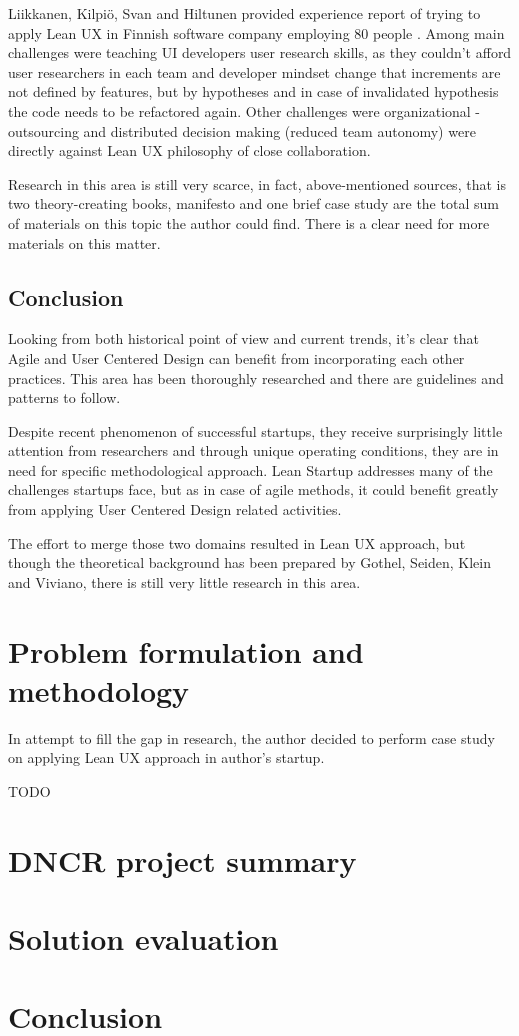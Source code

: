 \documentclass{article}
\begin{document}
Liikkanen, Kilpiö, Svan and Hiltunen provided experience report of trying to apply Lean UX in Finnish software company employing 80 people \cite{liikkanen2014lean}. Among main challenges were teaching UI developers user research skills, as they couldn't afford user researchers in each team and developer mindset change that increments are not defined by features, but by hypotheses and in case of invalidated hypothesis the code needs to be refactored again. Other challenges were organizational - outsourcing and distributed decision making (reduced team autonomy) were directly against Lean UX philosophy of close collaboration.

Research in this area is still very scarce, in fact, above-mentioned sources, that is two theory-creating books, manifesto and one brief case study are the total sum of materials on this topic the author could find. There is a clear need for more materials on this matter.

\subsection{Conclusion}
Looking from both historical point of view and current trends, it's clear that Agile and User Centered Design can benefit from incorporating each other practices. This area has been thoroughly researched and there are guidelines and patterns to follow.

Despite recent phenomenon of successful startups, they receive surprisingly little attention from researchers and through unique operating conditions, they are in need for specific methodological approach. Lean Startup addresses many of the challenges startups face, but as in case of agile methods, it could benefit greatly from applying User Centered Design related activities.

The effort to merge those two domains resulted in Lean UX approach, but though the theoretical background has been prepared by Gothel, Seiden, Klein and Viviano, there is still very little research in this area.

\section{Problem formulation and methodology}
In attempt to fill the gap in research, the author decided to perform case study on applying Lean UX approach in author's startup.

TODO

\section{DNCR project summary}
\section{Solution evaluation}
\section{Conclusion}

 
\end{document}
